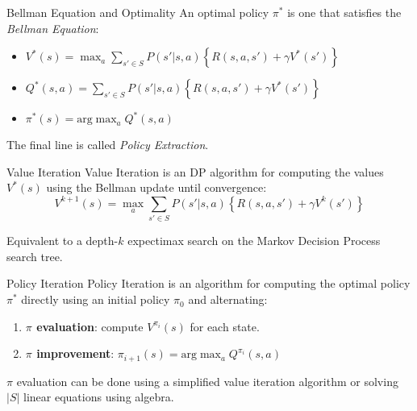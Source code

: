 \documentclass{cognito}
\begin{document}
\begin{note}{Bellman Equation and Optimality}
	An optimal policy $\pi^*$ is one that satisfies the \emph{Bellman Equation}:
	\begin{itemize}
		\item $V^*(s) = \max_a  \sum_{s' \in S} P(s' | s, a) \left\{ R(s,a,s') + \gamma V^*(s') \right\}$
		\item $Q^*(s, a) = \sum_{s' \in S} P(s' | s, a) \left\{ R(s,a,s') + \gamma V^*(s') \right\}$
		\item $\pi^*(s) = \text{arg}\max_a Q^*(s, a)$
	\end{itemize}
	\begin{remark} The final line is called \emph{Policy Extraction}. \end{remark}
	\vspace{-5pt}
\end{note}

\begin{note}{Value Iteration}
	Value Iteration is an DP algorithm for computing the values $V^*(s)$ using the Bellman update
	until convergence:
	$$
		V^{k+1}(s) = \max_a  \sum_{s' \in S} P(s' | s, a) \left\{ R(s,a,s') + \gamma V^k(s') \right\}
	$$
	\begin{remark} Equivalent to a depth-$k$ expectimax search on the Markov Decision Process search tree.
	\end{remark}
	\vspace{-5pt}
\end{note}


\begin{note}{Policy Iteration}
	Policy Iteration is an algorithm for computing the optimal policy $\pi^*$ directly using an initial policy $\pi_0$ and alternating:
	\begin{enumerate}
		\item {\bf $\pi$ evaluation}: compute $V^{\pi_i}(s)$ for each state.
		\item {\bf $\pi$ improvement}: $\pi_{i+1}(s) = \text{arg}\max_a Q^{\pi_i}(s, a)$
	\end{enumerate}
	\begin{remark} $\pi$ evaluation can be done using a simplified value iteration algorithm
		or solving $|S|$ linear equations using algebra.
	\end{remark}
	\vspace{-5pt}
\end{note}
\end{document}
